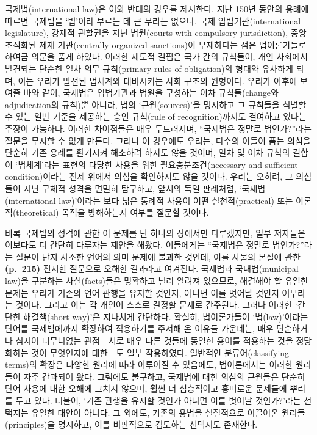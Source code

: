 국제법(international law)은 이와 반대의 경우를 제시한다. 지난 150년
동안의 용례에 따르면 국제법을 `법'이라 부르는 데 큰 무리는 없으나, 국제
입법기관(international legislature), 강제적 관할권을 지닌 법원(courts
with compulsory jurisdiction), 중앙 조직화된 제재 기관(centrally
organized sanctions)이 부재하다는 점은 법이론가들로 하여금 의문을 품게
하였다. 이러한 제도적 결핍은 국가 간의 규칙들이, 개인 사회에서 발견되는
단순한 일차 의무 규칙(primary rules of obligation)의 형태와 유사하게
되며, 이는 우리가 발전된 법체계와 대비시키는 사회 구조의 원형이다.
우리가 이후에 보여줄 바와 같이, 국제법은 입법기관과 법원을 구성하는 이차
규칙들(change와 adjudication의 규칙)뿐 아니라, 법의 `근원(sources)'을
명시하고 그 규칙들을 식별할 수 있는 일반 기준을 제공하는 승인 규칙(rule
of recognition)까지도 결여하고 있다는 주장이 가능하다. 이러한 차이점들은
매우 두드러지며, ``국제법은 정말로 법인가?''라는 질문을 무시할 수 없게
만든다. 그러나 이 경우에도 우리는, 다수의 이들이 품는 의심을 단순히 기존
용례를 환기시켜 해소하려 하지도 않을 것이며, 일차 및 이차 규칙의 결합이
`법체계'라는 표현의 타당한 사용을 위한 필요충분조건(necessary and
sufficient condition)이라는 전제 위에서 의심을 확인하지도 않을 것이다.
우리는 오히려, 그 의심들이 지닌 구체적 성격을 면밀히 탐구하고, 앞서의
독일 판례처럼, `국제법(international law)'이라는 보다 넓은 통례적 사용이
어떤 실천적(practical) 또는 이론적(theoretical) 목적을 방해하는지 여부를
질문할 것이다.

비록 국제법의 성격에 관한 이 문제를 단 하나의 장에서만 다루겠지만, 일부
저자들은 이보다도 더 간단히 다루자는 제안을 해왔다. 이들에게는
``국제법은 정말로 법인가?''라는 질문이 단지 사소한 언어의 의미 문제에
불과한 것인데, 이를 사물의 본질에 관한 \textbf{(p.~215)} 진지한 질문으로
오해한 결과라고 여겨진다. 국제법과 국내법(municipal law)을 구분하는
사실(facts)들은 명확하고 널리 알려져 있으므로, 해결해야 할 유일한 문제는
우리가 기존의 언어 관행을 유지할 것인지, 아니면 이를 벗어날 것인지
여부라는 것이다. 그리고 이는 각 개인이 스스로 결정할 문제로 간주된다.
그러나 이러한 `간단한 해결책(short way)'은 지나치게 간단하다. 확실히,
법이론가들이 `법(law)'이라는 단어를 국제법에까지 확장하여 적용하기를
주저해 온 이유들 가운데는, 매우 단순하거나 심지어 터무니없는 관점―서로
매우 다른 것들에 동일한 용어를 적용하는 것을 정당화하는 것이 무엇인지에
대한―도 일부 작용하였다. 일반적인 분류어(classifying terms)의 확장은
다양한 원리에 따라 이루어질 수 있음에도, 법이론에서는 이러한 원리들이
자주 간과되어 왔다. 그럼에도 불구하고, 국제법에 대한 의심의 근원들은
단순히 단어 사용에 대한 오해에 그치지 않으며, 훨씬 더 심층적이고
흥미로운 문제들에 뿌리를 두고 있다. 더불어, `기존 관행을 유지할 것인가
아니면 이를 벗어날 것인가?'라는 선택지는 유일한 대안이 아니다. 그
외에도, 기존의 용법을 실질적으로 이끌어온 원리들(principles)을 명시하고,
이를 비판적으로 검토하는 선택지도 존재한다.

